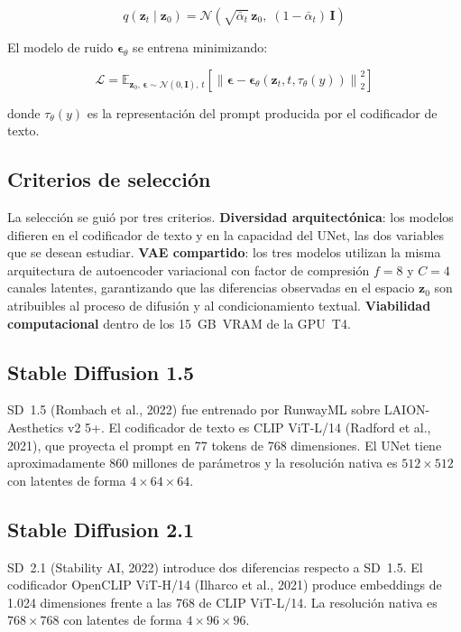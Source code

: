 \documentclass[12pt, a4paper, twoside]{book}
\newcommand{\z}{\mathbf{z}}
\newcommand{\eps}{\boldsymbol{\epsilon}}
\newcommand{\E}{\mathbb{E}}
\newcommand{\norm}[1]{\left\|#1\right\|_2}
\begin{document}
\begin{equation}
q(\z_t \mid \z_0) = \mathcal{N}\!\left(\sqrt{\bar{\alpha}_t}\,\z_0,\; (1 - \bar{\alpha}_t)\,\mathbf{I}\right)
\end{equation}

El modelo de ruido $\eps_\theta$ se entrena minimizando:

\begin{equation}
\mathcal{L} = \E_{\z_0,\, \eps \sim \mathcal{N}(0,\mathbf{I}),\, t}\!
\left[\norm{\eps - \eps_\theta(\z_t, t, \tau_\theta(y))}^2\right]
\end{equation}

donde $\tau_\theta(y)$ es la representación del prompt producida por el codificador de texto.

\subsection{Criterios de selección}

La selección se guió por tres criterios. \textbf{Diversidad arquitectónica}: los modelos difieren en el codificador de texto y en la capacidad del UNet, las dos variables que se desean estudiar. \textbf{VAE compartido}: los tres modelos utilizan la misma arquitectura de autoencoder variacional con factor de compresión $f = 8$ y $C = 4$ canales latentes, garantizando que las diferencias observadas en el espacio $\z_0$ son atribuibles al proceso de difusión y al condicionamiento textual. \textbf{Viabilidad computacional} dentro de los 15~GB~VRAM de la GPU~T4.

\subsection{Stable Diffusion 1.5}

SD~1.5 (Rombach et al., 2022) fue entrenado por RunwayML sobre LAION-Aesthetics v2 5+. El codificador de texto es CLIP ViT-L/14 (Radford et al., 2021), que proyecta el prompt en 77 tokens de 768 dimensiones. El UNet tiene aproximadamente 860 millones de parámetros y la resolución nativa es $512 \times 512$ con latentes de forma $4 \times 64 \times 64$.

\subsection{Stable Diffusion 2.1}

SD~2.1 (Stability AI, 2022) introduce dos diferencias respecto a SD~1.5. El codificador OpenCLIP ViT-H/14 (Ilharco et al., 2021) produce embeddings de 1.024 dimensiones frente a las 768 de CLIP ViT-L/14. La resolución nativa es $768 \times 768$ con latentes de forma $4 \times 96 \times 96$.
\end{document}
